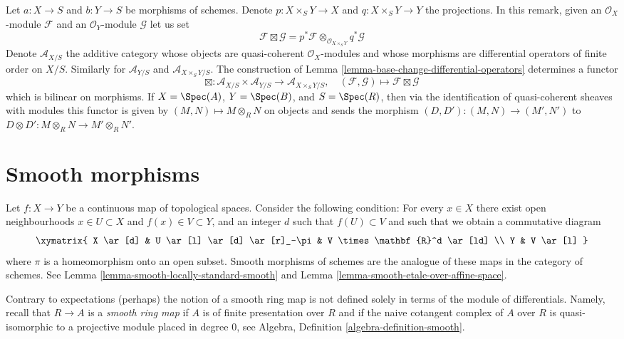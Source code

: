 \begin{remark}
\label{remark-base-change-differential-operators}
Let $a : X \to S$ and $b : Y \to S$ be morphisms of schemes.
Denote $p : X \times_S Y \to X$ and $q : X \times_S Y \to Y$ the
projections. In this remark, given an $\mathcal{O}_X$-module $\mathcal{F}$
and an $\mathcal{O}_Y$-module $\mathcal{G}$ let us set
$$
\mathcal{F} \boxtimes \mathcal{G} =
p^*\mathcal{F} \otimes_{\mathcal{O}_{X \times_S Y}} q^*\mathcal{G}
$$
Denote $\mathcal{A}_{X/S}$ the additive category
whose objects are quasi-coherent $\mathcal{O}_X$-modules and
whose morphisms are differential operators of finite order on $X/S$.
Similarly for $\mathcal{A}_{Y/S}$ and $\mathcal{A}_{X \times_S Y/S}$.
The construction of Lemma \ref{lemma-base-change-differential-operators}
determines a functor
$$
\boxtimes : 
\mathcal{A}_{X/S} \times \mathcal{A}_{Y/S} \longrightarrow
\mathcal{A}_{X \times_S Y/S},
\quad
(\mathcal{F}, \mathcal{G}) \longmapsto \mathcal{F} \boxtimes \mathcal{G}
$$
which is bilinear on morphisms. If $X = \Spec(A)$, $Y = \Spec(B)$, and
$S = \Spec(R)$, then via the identification of quasi-coherent sheaves
with modules this functor is given by $(M, N) \mapsto M \otimes_R N$
on objects and sends the morphism $(D, D') : (M, N) \to (M', N')$ to
$D \otimes D' : M \otimes_R N \to M' \otimes_R N'$.
\end{remark}








\section{Smooth morphisms}
\label{section-smooth}

\noindent
Let $f : X \to Y$ be a continuous map of topological spaces.
Consider the following condition:
For every $x \in X$ there exist open neighbourhoods
$x \in U \subset X$ and $f(x) \in V \subset Y$, and an integer $d$
such that $f(U) \subset V$ and such that we obtain
a commutative diagram
$$
\xymatrix{
X \ar[d] &
U \ar[l] \ar[d] \ar[r]_-\pi &
V \times \mathbf{R}^d \ar[ld] \\
Y & V \ar[l]
}
$$
where $\pi$ is a homeomorphism onto an open subset.
Smooth morphisms of schemes are the analogue of these maps
in the category of schemes. See
Lemma \ref{lemma-smooth-locally-standard-smooth}
and
Lemma \ref{lemma-smooth-etale-over-affine-space}.

\medskip\noindent
Contrary to expectations (perhaps) the notion
of a smooth ring map is not defined solely in terms
of the module of differentials. Namely, recall that
$R \to A$ is a {\it smooth ring map} if $A$ is of finite presentation over $R$
and if the naive cotangent complex of $A$ over $R$ is quasi-isomorphic
to a projective module placed in degree $0$, see
Algebra, Definition \ref{algebra-definition-smooth}.

